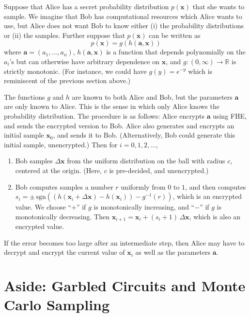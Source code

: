 \documentclass[12pt]{article}
\begin{document}
Suppose that Alice has a secret probability distribution $p(\textbf{x})$ that she wants to sample.  We imagine that Bob has computational resources which Alice wants to use, but Alice does not want Bob to know either (i) the probability distributions or (ii) the samples.  Further suppose that $p(\textbf{x})$ can be written as
\begin{equation}
p(\textbf{x}) = g(h(\textbf{a},\textbf{x}))
\end{equation}
where $\textbf{a} = (a_1,...,a_n)$, $h(\textbf{a},\textbf{x})$ is a function that depends polynomially on the $a_i$'s but can otherwise have arbitrary dependence on $\textbf{x}$, and $g : (0,\infty) \to \mathbb{R}$ is strictly monotonic.  (For instance, we could have $g(y) = e^{-y}$ which is reminiscent of the previous section above.)

The functions $g$ and $h$ are known to both Alice and Bob, but the parameters $\textbf{a}$ are only known to Alice.  This is the sense in which only Alice knows the probability distribution.
The procedure is as follows: Alice encrypts $\textbf{a}$ using FHE, and sends the encrypted version to Bob.  Alice also generates and encrypts an initial sample $\textbf{x}_0$, and sends it to Bob.  (Alternatively, Bob could generate this initial sample, unencrypted.)  Then for $i = 0,1,2,...$,
\begin{enumerate}
\item Bob samples $\Delta \textbf{x}$ from the uniform distribution on the ball with radius $c$, centered at the origin.  (Here, $c$ is pre-decided, and unencrypted.)
\item Bob computes samples a number $r$ uniformly from $0$ to $1$, and then computes $s_i = \pm \, \text{sgn}\left(\left(h(\textbf{x}_i + \Delta \textbf{x}) - h(\textbf{x}_i) \right) - g^{-1}(r) \right)$, which is an encrypted value.  We choose ``$+$'' if $g$ is monotonically increasing, and ``$-$'' if $g$ is monotonically decreasing.  Then $\textbf{x}_{i+1} = \textbf{x}_i + (s_i + 1) \, \Delta \textbf{x}$, which is also an encrypted value.
\end{enumerate}
If the error becomes too large after an intermediate step, then Alice may have to decrypt and encrypt the current value of $\textbf{x}_i$ as well as the parameters $\textbf{a}$.

\section{Aside: Garbled Circuits and Monte Carlo Sampling}
\end{document}
